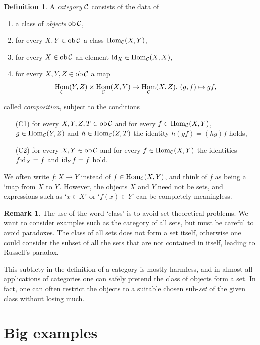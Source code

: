 \documentclass[11pt]{amsbook}
\DeclareMathOperator\Hom{Hom}
\DeclareMathOperator\ob{ob}
\def\id{{\rm id}}
\theoremstyle{plain}
\theoremstyle{definition}
\newtheorem{definition}[theorem]{Definition}
\newtheorem{remark}[theorem]{Remark}
\begin{document}
\begin{definition}A \emph{category} ${\mathcal{C}}$ consists of the data of
\begin{enumerate}
\item a class of \emph{objects} $\ob \cC$, 
\item for every $X,Y\in \ob \cC$ a class $\Hom_\cC(X,Y)$,
\item for every $X\in \ob\cC$ an element $\id_X \in \Hom_\cC(X,X)$,
\item for every $X,Y,Z \in \ob \cC$ a map
\[
	  \Hom_\cC(Y,Z) \times \Hom_\cC(X,Y) \to \Hom_\cC(X,Z),\,
	(g,f) \mapsto gf,
\]
\end{enumerate}
called \emph{composition}, subject to the conditions
\begin{enumerate}
\item[(C1)] for every $X,Y,Z,T \in \ob \cC$ and for every $f \in \Hom_\cC(X,Y)$, $g\in \Hom_\cC(Y,Z)$ and $h \in \Hom_\cC(Z,T)$ the identity $h(gf) = (hg)f$ holds,
\item[(C2)] for every $X,Y\in \ob \cC$ and for every $f\in \Hom_\cC(X,Y)$ the identities $f \id_X = f$ and $\id_Y f = f$ hold.
\end{enumerate}
\end{definition}

We often write $f\colon X\to Y$ instead of $f\in \Hom_\cC(X,Y)$, and think of $f$ as being a `map from $X$ to $Y$'. However, the objects $X$ and $Y$ need not be sets, and expressions such as `$x\in X$' or `$f(x)\in Y$' can be completely meaningless. 

\begin{remark}
The use of the word `class' is to avoid set-theoretical problems. We want to consider examples such as the category of all sets, but must be careful to avoid paradoxes. The class of all sets does not form a set itself, otherwise one could consider the subset of all the sets that are not contained in itself, leading to Russell's paradox. 

This subtlety in the definition of a category is mostly harmless, and in almost all applications of categories one can safely pretend the class of objects form a set. In fact, one can often restrict the objects to a suitable chosen sub-\emph{set} of the given class without losing much.
\end{remark}

\section{Big examples}\label{sec:big-examples}
\end{document}
